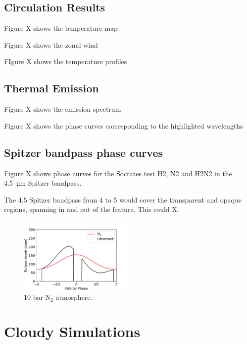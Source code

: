 \subsection{Circulation Results}

Figure X shows the temperature map

Figure X shows the zonal wind

FIgure X shows the temperature profiles

\subsection{Thermal Emission}

Figure X shows the emission spectrum

Figure X shows the phase curves corresponding to the highlighted wavelengths

\subsection{Spitzer bandpass phase curves}

Figure X shows phase curves for the Socrates test H2, N2 and H2N2 in the \SI{4.5}{\micro\metre} Spitzer bandpass.

The 4.5 Spitzer bandpass from 4 to 5 would cover the transparent and opaque regions, spanning in and out of the feature. This could X.


\begin{figure}
  \centering
    \includegraphics[width=0.49\textwidth]{figures/soc-lava-planets/spitzer-pc.pdf}
    \caption{10 bar N$_{2}$ atmosphere.}\label{fig:soc-tp-n2}
\end{figure}





\section{Cloudy Simulations}


